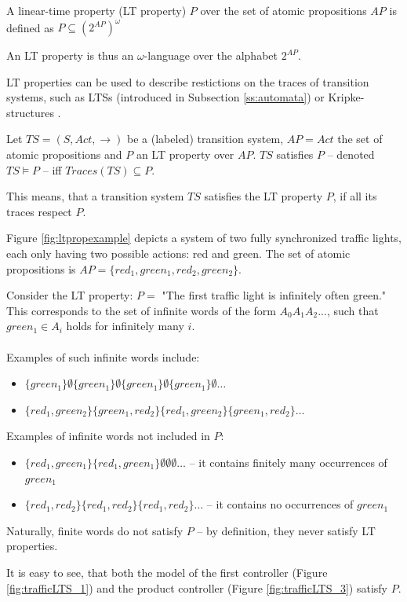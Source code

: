 \begin{definition}
	\label{def:ltproperty}
	A linear-time property (LT property) $P$ over the set of atomic propositions $AP$ is defined as $P \subseteq (2^{AP})^\omega$
	
	An LT property is thus an $\omega$-language over the alphabet $2^{AP}$.
\end{definition}

LT properties can be used to describe restictions on the traces of transition systems, such as LTSs (introduced in Subsection \ref{ss:automata}) or Kripke-structures \cite{Kripke1963-KRISCO}.

\begin{definition}
	\label{def:ltsatisfaction}
	Let $TS = (S, Act, \rightarrow)$ be a (labeled) transition system, $AP = Act$ the set of atomic propositions and $P$ an LT property over $AP$. $TS$ satisfies $P$ -- denoted $TS \vDash P$ -- iff $Traces(TS) \subseteq P$.
	
	This means, that a transition system $TS$ satisfies the LT property $P$, if all its traces respect $P$.
\end{definition}

\begin{example}
	\label{ex:ltpropexample}
	Figure \ref{fig:ltpropexample} depicts a system of two fully synchronized traffic lights, each only having two possible actions: red and green. The set of atomic propositions is $AP = \{red_1, green_1, red_2, green_2\}$.
	
	Consider the LT property: $P=$ "The first traffic light is infinitely often green." This corresponds to the set of infinite words of the form $A_0A_1A_2...$, such that $green_1 \in A_i$ holds for infinitely many $i$. \\\\
	Examples of such infinite words include:
	\begin{itemize}
		\item {$\{green_1\}\emptyset\{green_1\}\emptyset\{green_1\}\emptyset\{green_1\}\emptyset$$\dots$}
		\item {$\{red_1,green_2\}\{green_1,red_2\}\{red_1,green_2\}\{green_1,red_2\}$$\dots$}
	\end{itemize}
	Examples of infinite words not included in $P$:
	\begin{itemize}
		\item {$\{red_1,green_1\}\{red_1,green_1\}\emptyset\emptyset\emptyset$$\dots$ -- it contains finitely many occurrences of $green_1$}
		\item {$\{red_1,red_2\}\{red_1,red_2\}\{red_1,red_2\}$$\dots$ -- it contains no occurrences of $green_1$}
	\end{itemize}

	Naturally, finite words do not satisfy $P$ -- by definition, they never satisfy LT properties.

	It is easy to see, that both the model of the first controller (Figure \ref{fig:trafficLTS_1}) and the product controller (Figure \ref{fig:trafficLTS_3}) satisfy $P$.
\end{example}

